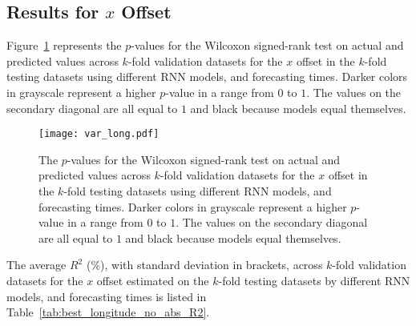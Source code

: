 \subsection{Results for $x$ Offset}

Figure~\ref{fig:var_long} represents the $p$-values for the Wilcoxon signed-rank test on actual and predicted values across $k$-fold validation datasets for the $x$ offset in the $k$-fold testing datasets using different RNN models, and forecasting times. Darker colors in grayscale represent a higher $p$-value in a range from $0$ to $1$. The values on the secondary diagonal are all equal to $1$ and black because models equal themselves.

\begin{figure}[!ht]
	\centering
	\texttt{[image: var\_long.pdf]}
	\caption{The $p$-values for the Wilcoxon signed-rank test on actual and predicted values across $k$-fold validation datasets for the $x$ offset in the $k$-fold testing datasets using different RNN models, and forecasting times. Darker colors in grayscale represent a higher $p$-value in a range from $0$ to $1$. The values on the secondary diagonal are all equal to $1$ and black because models equal themselves.}
	\label{fig:var_long}
\end{figure}

The average $R^{2}$ (\%), with standard deviation in brackets, across $k$-fold validation datasets for the $x$ offset estimated on the $k$-fold testing datasets by different RNN models, and forecasting times is listed in Table~\ref{tab:best_longitude_no_abs_R2}.

